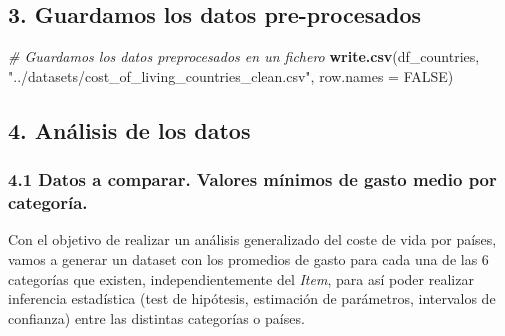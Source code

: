 \documentclass[
]{article}
\newenvironment{Shaded}{\begin{snugshade}}{\end{snugshade}}
\newcommand{\AttributeTok}[1]{\textcolor[rgb]{0.13,0.29,0.53}{#1}}
\newcommand{\CommentTok}[1]{\textcolor[rgb]{0.56,0.35,0.01}{\textit{#1}}}
\newcommand{\ConstantTok}[1]{\textcolor[rgb]{0.56,0.35,0.01}{#1}}
\newcommand{\FunctionTok}[1]{\textcolor[rgb]{0.13,0.29,0.53}{\textbf{#1}}}
\newcommand{\NormalTok}[1]{#1}
\newcommand{\StringTok}[1]{\textcolor[rgb]{0.31,0.60,0.02}{#1}}
\begin{document}
\hypertarget{guardamos-los-datos-pre-procesados}{%
\subsection{3. Guardamos los datos
pre-procesados}\label{guardamos-los-datos-pre-procesados}}

\begin{Shaded}
\begin{Highlighting}[]
\CommentTok{\# Guardamos los datos preprocesados en un fichero}
\FunctionTok{write.csv}\NormalTok{(df\_countries, }\StringTok{"../datasets/cost\_of\_living\_countries\_clean.csv"}\NormalTok{, }\AttributeTok{row.names =} \ConstantTok{FALSE}\NormalTok{)}
\end{Highlighting}
\end{Shaded}

\hypertarget{anuxe1lisis-de-los-datos}{%
\subsection{4. Análisis de los datos}\label{anuxe1lisis-de-los-datos}}

\hypertarget{datos-a-comparar.-valores-muxednimos-de-gasto-medio-por-categoruxeda.}{%
\subsubsection{4.1 Datos a comparar. Valores mínimos de gasto medio por
categoría.}\label{datos-a-comparar.-valores-muxednimos-de-gasto-medio-por-categoruxeda.}}

Con el objetivo de realizar un análisis generalizado del coste de vida
por países, vamos a generar un dataset con los promedios de gasto para
cada una de las 6 categorías que existen, independientemente del
\emph{Item}, para así poder realizar inferencia estadística (test de
hipótesis, estimación de parámetros, intervalos de confianza) entre las
distintas categorías o países.
\end{document}
